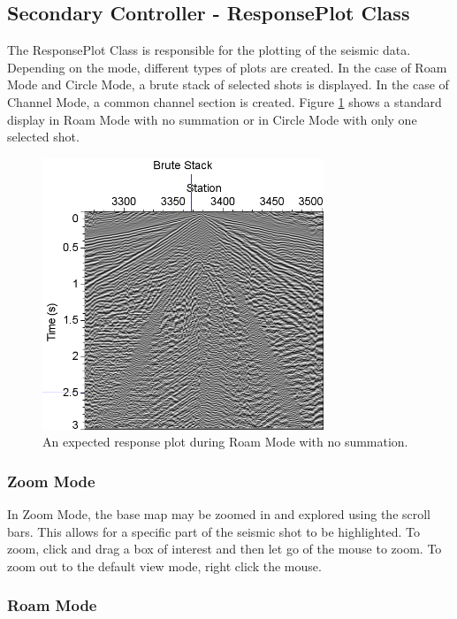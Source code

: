 \documentclass[12pt]{article}
\begin{document}
\subsection{Secondary Controller - ResponsePlot Class}

The ResponsePlot Class is responsible for the plotting of the seismic data. Depending on the mode, different types of plots are created.  In the case of Roam Mode and Circle Mode, a brute stack of selected shots is displayed. In the case of Channel Mode, a common channel section is created. Figure \ref{FIG:RP} shows a standard display in Roam Mode with no summation or in Circle Mode with only one selected shot.

\begin{figure}[H]
\centering
\includegraphics[width=0.75\textwidth]{./figs/fig4.png}
\caption{An expected response plot during Roam Mode with no summation.}
\label{FIG:RP}
\end{figure}

\subsubsection{Zoom Mode}

In Zoom Mode, the base map may be zoomed in and explored using the scroll bars. This allows for a specific part of the seismic shot to be highlighted. To zoom, click and drag a box of interest and then let go of the mouse to zoom. To zoom out to the default view mode, right click the mouse. 

\subsubsection{Roam Mode}
\end{document}
